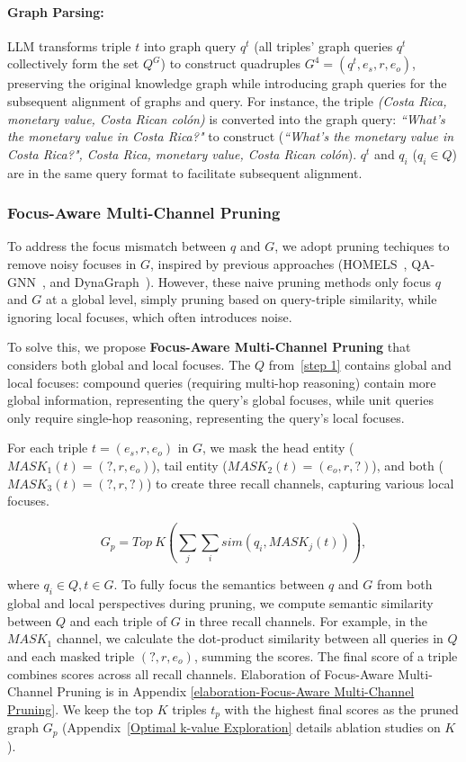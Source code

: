 \documentclass[11pt]{article}
\begin{document}
\paragraph{Graph Parsing:} LLM transforms triple $t$ into graph query $q^t$ (all triples' graph queries $q^t$ collectively form the set $Q^G$) to construct quadruples $G^4 = (q^t, e_s, r, e_o)$, preserving the original knowledge graph while introducing graph queries for the subsequent alignment of graphs and query. For instance, the triple \textit{(Costa Rica, monetary value, Costa Rican colón)} is converted into the graph query: \textit{``What’s the monetary value in Costa Rica?"} to construct (\textit{``What’s the monetary value in Costa Rica?", Costa Rica, monetary value, Costa Rican colón}).
$q^t$ and $q_i$ ($q_i \in Q$) are in the same query format to facilitate subsequent alignment.

\subsubsection{Focus-Aware Multi-Channel Pruning}
\label{Structure-Aware Multi-Channel Pruning}

To address the focus mismatch between $q$ and $G$, we adopt pruning techiques to remove noisy focuses in $G$, inspired by previous approaches (HOMELS~\cite{panda2024holmeshyperrelationalknowledgegraphs}, QA-GNN~\cite{yasunaga2022qagnnreasoninglanguagemodels}, and DynaGraph~\cite{10.1145/3534540.3534691}). However, these naive pruning methods only focus $q$ and $G$ at a global level, simply pruning based on query-triple similarity, while ignoring local focuses, which often introduces noise.

To solve this, we propose \textbf{Focus-Aware Multi-Channel Pruning} that considers both global and local focuses. The $Q$ from~\ref{step 1} contains global and local focuses: compound queries (requiring multi-hop reasoning) contain more global information, representing the query's global focuses, while unit queries only require single-hop reasoning, representing the query's local focuses.

For each triple $t = (e_s, r, e_o)$ in $G$, we mask the head entity ($MASK_1(t) = (?, r, e_o)$), tail entity ($MASK_2(t) = (e_o, r, ?)$), and both ($MASK_3(t) = (? , r, ?)$) to create three recall channels, capturing various local focuses. 

{\small
\[G_{p} = Top~K\left( {\sum_{j}{\sum_{i}{sim\left( q_{i},{MASK}_{j}(t) \right)}}} \right),\]
}

where $q_{i} \in Q, t\in {G}$. To fully focus the semantics between $q$ and $G$ from both global and local perspectives during pruning, we compute semantic similarity between $Q$ and each triple of $G$ in three recall channels. For example, in the $MASK_1$ channel, we calculate the dot-product similarity between all queries in $Q$ and each masked triple $(?, r, e_o)$, summing the scores. The final score of a triple combines scores across all recall channels. Elaboration of Focus-Aware Multi-Channel Pruning is in Appendix \ref{elaboration-Focus-Aware Multi-Channel Pruning}. We keep the top $K$ triples $t_p$ with the highest final scores as the pruned graph $G_p$ (Appendix~\ref{Optimal k-value Exploration} details ablation studies on $K$).
\end{document}
